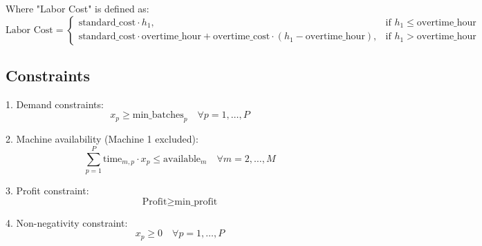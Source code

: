 \documentclass{article}
\begin{document}
Where "Labor Cost" is defined as:
\begin{equation*}
\text{Labor Cost} = 
\begin{cases} 
\text{standard\_cost} \cdot h_1, & \text{if } h_1 \leq \text{overtime\_hour} \\
\text{standard\_cost} \cdot \text{overtime\_hour} + \text{overtime\_cost} \cdot (h_1 - \text{overtime\_hour}), & \text{if } h_1 > \text{overtime\_hour}
\end{cases}
\end{equation*}

\subsection*{Constraints}
1. Demand constraints:
   \begin{equation*}
   x_p \geq \text{min\_batches}_p \quad \forall p = 1, \dots, P
   \end{equation*}

2. Machine availability (Machine 1 excluded):
   \begin{equation*}
   \sum_{p=1}^{P} \text{time}_{m,p} \cdot x_p \leq \text{available}_m \quad \forall m = 2, \dots, M
   \end{equation*}

3. Profit constraint:
   \begin{equation*}
   \text{Profit} \geq \text{min\_profit}
   \end{equation*}

4. Non-negativity constraint:
   \begin{equation*}
   x_p \geq 0 \quad \forall p = 1, \dots, P
   \end{equation*}
\end{document}
